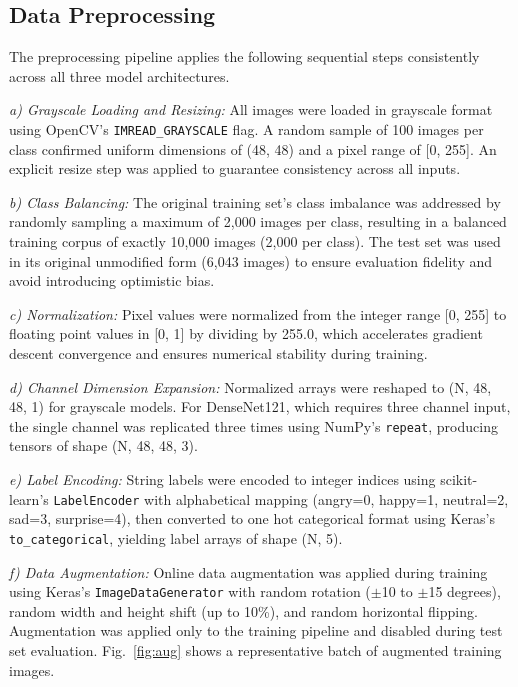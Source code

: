 \documentclass[conference]{IEEEtran}
\begin{document}
\subsection{Data Preprocessing}

The preprocessing pipeline applies the following sequential steps
consistently across all three model architectures.

\textit{a) Grayscale Loading and Resizing:} All images were loaded in grayscale
format using OpenCV's \texttt{IMREAD\_GRAYSCALE} flag. A random sample of
100 images per class confirmed uniform dimensions of (48, 48) and a pixel
range of [0, 255]. An explicit resize step was applied to guarantee
consistency across all inputs.

\textit{b) Class Balancing:} The original training set's class imbalance was
addressed by randomly sampling a maximum of 2,000 images per class, resulting
in a balanced training corpus of exactly 10,000 images (2,000 per class). The
test set was used in its original unmodified form (6,043 images) to ensure
evaluation fidelity and avoid introducing optimistic bias.

\textit{c) Normalization:} Pixel values were normalized from the integer range
[0, 255] to floating point values in [0, 1] by dividing by 255.0, which
accelerates gradient descent convergence and ensures numerical stability
during training.

\textit{d) Channel Dimension Expansion:} Normalized arrays were reshaped to
(N, 48, 48, 1) for grayscale models. For DenseNet121, which requires three
channel input, the single channel was replicated three times using NumPy's
\texttt{repeat}, producing tensors of shape (N, 48, 48, 3).

\textit{e) Label Encoding:} String labels were encoded to integer indices using
scikit-learn's \texttt{LabelEncoder} with alphabetical mapping
(angry=0, happy=1, neutral=2, sad=3, surprise=4), then converted to one
hot categorical format using Keras's \texttt{to\_categorical}, yielding
label arrays of shape (N, 5).

\textit{f) Data Augmentation:} Online data augmentation was applied during
training using Keras's \texttt{ImageDataGenerator} with random rotation
($\pm$10 to $\pm$15 degrees), random width and height shift (up to 10\%),
and random horizontal flipping. Augmentation was applied only to the training
pipeline and disabled during test set evaluation. Fig.~\ref{fig:aug} shows
a representative batch of augmented training images.
\end{document}
